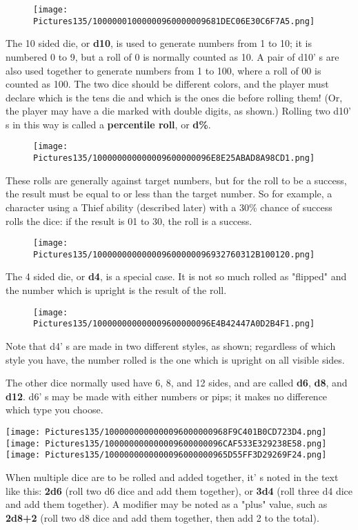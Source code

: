 \documentclass[a4paper,twoside,openany,10pt]{book}
\begin{document}
\begin{multicols}{2}
\begin{wrapfigure}{r}{1.77cm}
\texttt{[image: Pictures135/10000001000000960000009681DEC06E30C6F7A5.png]}
\end{wrapfigure}
The 10 sided die, or \textbf{d10}, is used to generate numbers from 1 to 10; it is numbered 0 to 9, but a roll of 0 is normally counted as 10. A pair of d10' s are also used together to generate numbers from 1 to 100, where a roll of 00 is counted as 100. The two dice should be different colors, and the player must declare which is the tens die and which is the ones die before rolling them! (Or, the player may have a die marked with double digits, as shown.) Rolling two d10' s in this way is called a \textbf{percentile roll}, or \textbf{d\%}.

\begin{wrapfigure}{r}{1.77cm}
	\texttt{[image: Pictures135/100000000000009600000096E8E25ABAD8A98CD1.png]}
\end{wrapfigure}
These rolls are generally against target numbers, but for the roll to be a success, the result must be equal to or less than the target number. So for example, a character using a Thief ability (described later) with a 30\% chance of success rolls the dice: if the result is 01 to 30, the roll is a success.
\begin{wrapfigure}{r}{1.77cm}
\texttt{[image: Pictures135/100000000000009600000096932760312B100120.png]}
\end{wrapfigure}

The 4 sided die, or \textbf{d4}, is a special case. It is not so much rolled as "flipped" and the number which is upright is the result of the roll.
\begin{wrapfigure}{r}{1.77cm}
\texttt{[image: Pictures135/100000000000009600000096E4B42447A0D2B4F1.png]}	
\end{wrapfigure}
Note that d4' s are made in two different styles, as shown; regardless of which style you have, the number rolled is the one which is upright on all visible sides.

The other dice normally used have 6, 8, and 12 sides, and are called \textbf{d6}, \textbf{d8}, and \textbf{d12}. d6' s may be made with either numbers or pips; it makes no difference which type you choose. 

\texttt{[image: Pictures135/1000000000000096000000968F9C401B0CD723D4.png]}
\texttt{[image: Pictures135/100000000000009600000096CAF533E329238E58.png]}
\texttt{[image: Pictures135/1000000000000096000000965D55FF3D29269F24.png]}

When multiple dice are to be rolled and added together, it' s noted in the text like this: \textbf{2d6} (roll two d6 dice and add them together), or  \textbf{3d4} (roll three d4 dice and add them together). A modifier may be noted as a "plus" value, such as \textbf{2d8+2} (roll two d8 dice and add them together, then add 2 to the total).

\end{multicols}
\end{document}
